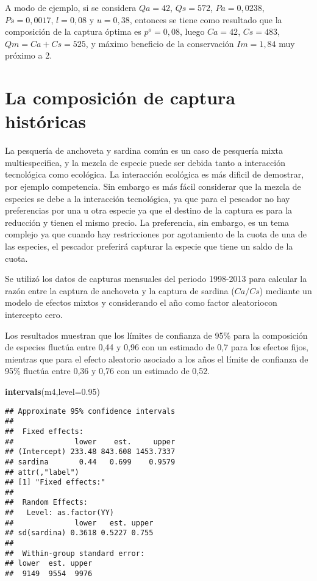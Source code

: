 \documentclass[]{article}
\newenvironment{Shaded}{\begin{snugshade}}{\end{snugshade}}
\newcommand{\KeywordTok}[1]{\textcolor[rgb]{0.13,0.29,0.53}{\textbf{{#1}}}}
\newcommand{\DataTypeTok}[1]{\textcolor[rgb]{0.13,0.29,0.53}{{#1}}}
\newcommand{\FloatTok}[1]{\textcolor[rgb]{0.00,0.00,0.81}{{#1}}}
\newcommand{\NormalTok}[1]{{#1}}
\begin{document}
A modo de ejemplo, si se considera $Qa=42$, $Qs=572$, $Pa=0,0238$,
$Ps=0,0017$, $l=0,08$ y $u=0,38$, entonces se tiene como resultado que
la composición de la captura óptima es $p^{o}=0,08$, luego $Ca=42$,
$Cs=483$, $Qm=Ca+Cs=525$, y máximo beneficio de la conservación
$Im=1,84$ muy próximo a 2.

\section{La composición de captura
históricas}\label{la-composicion-de-captura-historicas}

La pesquería de anchoveta y sardina común es un caso de pesquería mixta
multiespecifica, y la mezcla de especie puede ser debida tanto a
interacción tecnológica como ecológica. La interacción ecológica es más
dificil de demostrar, por ejemplo competencia. Sin embargo es más fácil
considerar que la mezcla de especies se debe a la interacción
tecnológica, ya que para el pescador no hay preferencias por una u otra
especie ya que el destino de la captura es para la reducción y tienen el
mismo precio. La preferencia, sin embargo, es un tema complejo ya que
cuando hay restricciones por agotamiento de la cuota de una de las
especies, el pescador preferirá capturar la especie que tiene un saldo
de la cuota.

Se utilizó los datos de capturas mensuales del periodo 1998-2013 para
calcular la razón entre la captura de anchoveta y la captura de sardina
($Ca/Cs$) mediante un modelo de efectos mixtos y considerando el año
como factor aleatoriocon intercepto cero.

Los resultados muestran que los límites de confianza de 95\% para la
composición de especies fluctúa entre 0,44 y 0,96 con un estimado de 0,7
para los efectos fijos, mientras que para el efecto aleatorio asociado a
los años el límite de confianza de 95\% fluctúa entre 0,36 y 0,76 con un
estimado de 0,52.

\begin{Shaded}
\begin{Highlighting}[]
\KeywordTok{intervals}\NormalTok{(m4,}\DataTypeTok{level=}\FloatTok{0.95}\NormalTok{)}
\end{Highlighting}
\end{Shaded}

\begin{verbatim}
## Approximate 95% confidence intervals
## 
##  Fixed effects:
##              lower    est.     upper
## (Intercept) 233.48 843.608 1453.7337
## sardina       0.44   0.699    0.9579
## attr(,"label")
## [1] "Fixed effects:"
## 
##  Random Effects:
##   Level: as.factor(YY) 
##              lower   est. upper
## sd(sardina) 0.3618 0.5227 0.755
## 
##  Within-group standard error:
## lower  est. upper 
##  9149  9554  9976
\end{verbatim}
\end{document}
